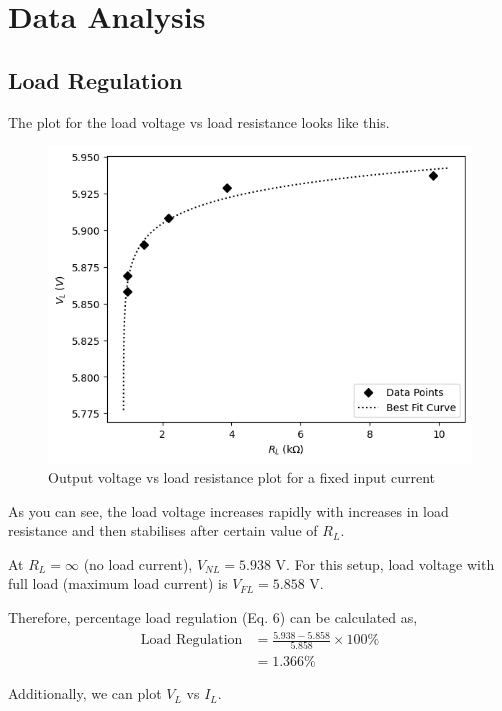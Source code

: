 \section{Data Analysis}
\subsection*{Load Regulation}
    The plot for the load voltage vs load resistance looks like this.

    \begin{figure}[H]
        \centering
        \includegraphics[width=0.8\columnwidth]{images/g1.png}
        \caption{Output voltage vs load resistance plot for a fixed input current}
        \label{fig:2}
    \end{figure}

    As you can see, the load voltage increases rapidly with increases in load resistance and then stabilises after certain value of $R_L$. 
    
    At $R_L = \infty$ (no load current), $V_{NL} = 5.938$ V. For this setup, load voltage with full load (maximum load current) is $V_{FL} = 5.858$ V.

    Therefore, percentage load regulation (Eq. 6) can be calculated as,
    \begin{align*}
        \text{Load Regulation} &= \frac{5.938-5.858}{5.858}\times 100\%\\
        &=1.366\%
    \end{align*}

    Additionally, we can plot $V_L$ vs $I_L$.


